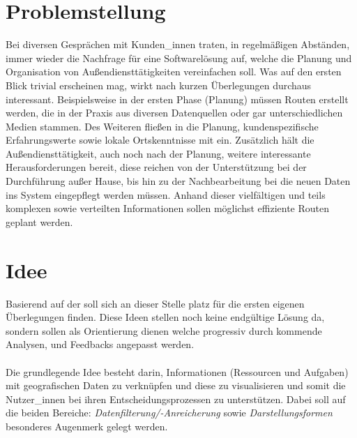 \documentclass[Bachelorarbeit.tex]{subfiles}
\begin{document}
\section{Problemstellung}
\label{chap:einfuehrung:sec:problemstellung}

Bei diversen Gesprächen mit Kunden\_innen traten, in regelmäßigen Abständen, immer wieder die Nachfrage für eine Softwarelösung auf, welche die Planung und Organisation von Außendiensttätigkeiten vereinfachen soll. 
Was auf den ersten Blick trivial erscheinen mag, wirkt nach kurzen Überlegungen durchaus interessant. 
Beispielsweise in der ersten Phase (Planung) müssen Routen erstellt werden, die in der Praxis aus diversen Datenquellen oder gar unterschiedlichen Medien stammen. 
Des Weiteren fließen in die Planung, kundenspezifische Erfahrungswerte sowie lokale Ortskenntnisse mit ein.
Zusätzlich hält die Außendiensttätigkeit, auch noch nach der Planung, weitere interessante Herausforderungen bereit, diese reichen von der Unterstützung bei der Durchführung außer Hause,  bis hin zu der Nachbearbeitung bei die neuen Daten ins System eingepflegt werden müssen.
Anhand dieser vielfältigen und teils komplexen sowie verteilten Informationen sollen möglichst effiziente Routen geplant werden. 


\begin{comment}
Als Grundlage für den Prototypen dient die Software Pery der Firma Perfany GmbH. 
Dabei handelt es sich um 
Wobei der Fokus auf dem Ticket Modul der Software ruht. Dabei ist das Anwendungskonzept des Moduls so ausgelegt das sämtliche Aufgaben, die die Firma betreffen , einzeln als Tickets erfasst werden. 
\end{comment}

\section{Idee}
\label{chap:einfuehrung:sec:idee}

Basierend auf der  soll sich an dieser Stelle platz für die ersten eigenen Überlegungen finden. 
Diese Ideen stellen noch keine endgültige Lösung da, sondern sollen als Orientierung dienen welche progressiv durch kommende Analysen,  und Feedbacks angepasst werden.\\
\\
Die grundlegende Idee besteht darin, Informationen (Ressourcen und Aufgaben) mit geografischen Daten zu verknüpfen und diese zu visualisieren und somit die Nutzer\_innen bei ihren Entscheidungsprozessen zu unterstützen. 
Dabei soll auf die beiden Bereiche: \textit{Datenfilterung/-Anreicherung} sowie \textit{Darstellungsformen} besonderes Augenmerk gelegt werden.
\end{document}
